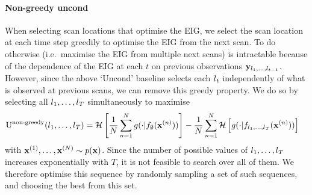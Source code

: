 \paragraph{Non-greedy uncond}
When selecting scan locations that optimise the EIG, we select the scan location
at each time step greedily to optimise the EIG from the next scan. To do
otherwise (i.e.~maximise the EIG from multiple next scans) is intractable
because of the dependence of the EIG at each $t$ on previous observations
${\mathbf{y}}_{l{}_1,\ldots,l{}_{t-1}}$. However, since the above `Uncond' baseline
selects each $l{}_t$ independently of what is observed at previous scans, we can
remove this greedy property. We do so by selecting all $l{}_1,\ldots,l{}_T$
simultaneously to maximise
\begin{align}
  \text{U}^{\text{non-greedy}}(l{}_1,&\ldots,l{}_T) = \mathcal{H} \left[ \frac{1}{N} \sum_{n=1}^N g(\cdot|f_{\emptyset}({\mathbf{x}}^{(n)})) \right] - \frac{1}{N} \sum_{n=1}^N  \mathcal{H} \left[ g(\cdot|f_{l{}_1,\ldots,l{}_T}({\mathbf{x}}^{(n)})) \right]
\end{align}
with ${\mathbf{x}}^{(1)},\ldots,{\mathbf{x}}^{(N)} \sim p({\mathbf{x}})$. Since the number of possible
values of $l{}_1,\ldots,l{}_T$ increases exponentially with $T$, it is not feasible
to search over all of them. We therefore optimise this sequence by
randomly sampling a set of such sequences, and choosing the best from this set.


